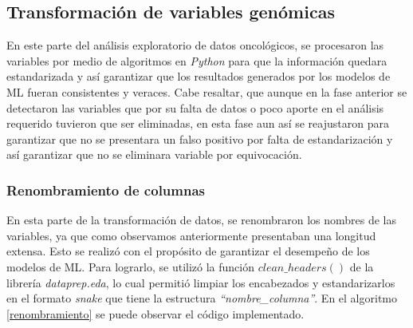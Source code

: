 \newpage
\subsection{Transformación de variables genómicas}
En este parte del análisis exploratorio de datos oncológicos, se procesaron las variables por medio de algoritmos en \textit{Python} para que la información quedara estandarizada y así garantizar que los resultados generados por los modelos de ML fueran consistentes y veraces. Cabe resaltar, que aunque en la fase anterior se detectaron las variables que por su falta de datos o poco aporte en el análisis requerido tuvieron que ser eliminadas, en esta fase aun así se reajustaron para garantizar que no se presentara un falso positivo por falta de estandarización y así garantizar que no se eliminara variable por equivocación.

\subsubsection{Renombramiento de columnas}
En esta parte de la transformación de datos, se renombraron los nombres de las variables, ya que como observamos anteriormente presentaban una longitud extensa. Esto se realizó con el propósito de garantizar el desempeño de los modelos de ML. Para lograrlo, se utilizó la función $clean\_headers()$ de la librería \textit{dataprep.eda}, lo cual permitió limpiar los encabezados y estandarizarlos en el formato \textit{snake} que tiene la estructura \textit{“nombre\_columna”}. En el algoritmo \ref{renombramiento} se puede observar el código implementado.

